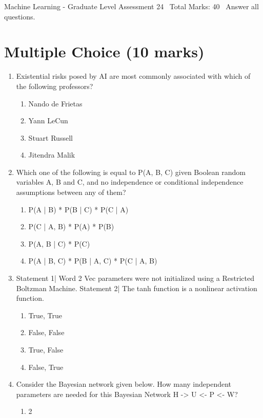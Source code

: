 \documentclass[12pt]{article}
\begin{document}
\begin{center}
Machine Learning - Graduate Level Assessment 24 \
Total Marks: 40 \
Answer all questions.
\end{center}

\section*{Multiple Choice (10 marks)}
\begin{enumerate}[label=\arabic*.]
\item Existential risks posed by AI are most commonly associated with which of the following professors?
\begin{enumerate}[label=(\alph*)]
    \item Nando de Frietas
    \item Yann LeCun
    \item Stuart Russell
    \item Jitendra Malik
\end{enumerate}
\item Which one of the following is equal to P(A, B, C) given Boolean random variables A, B and C, and no independence or conditional independence assumptions between any of them?
\begin{enumerate}[label=(\alph*)]
    \item P(A | B) * P(B | C) * P(C | A)
    \item P(C | A, B) * P(A) * P(B)
    \item P(A, B | C) * P(C)
    \item P(A | B, C) * P(B | A, C) * P(C | A, B)
\end{enumerate}
\item Statement 1| Word 2 Vec parameters were not initialized using a Restricted Boltzman Machine. Statement 2| The tanh function is a nonlinear activation function.
\begin{enumerate}[label=(\alph*)]
    \item True, True
    \item False, False
    \item True, False
    \item False, True
\end{enumerate}
\item Consider the Bayesian network given below. How many independent parameters are needed for this Bayesian Network H -\textgreater{} U \textless{}- P \textless{}- W?
\begin{enumerate}[label=(\alph*)]
    \item 2

\end{enumerate}
\end{enumerate}
\end{document}
